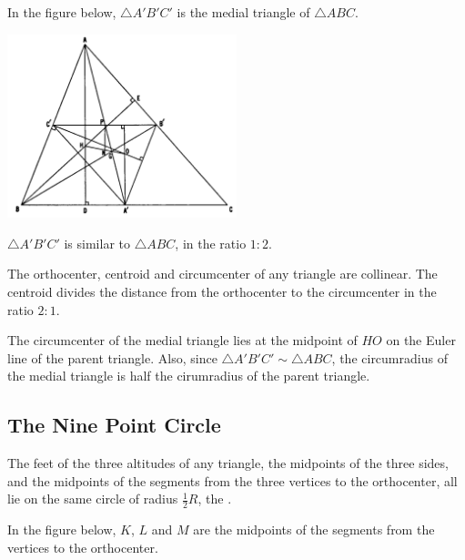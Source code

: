 \documentclass[DIV=12, a4]{scrartcl}
\begin{document}
In the figure below, $\triangle A'B'C'$
 is the medial triangle of $\triangle ABC$.
 
 \begin{center}
		\includegraphics[width=0.5\textwidth]{media/1-7A}
\end{center}

\begin{theorem}
	$\triangle A'B'C'$ is similar to $\triangle ABC$, in the ratio $1:2$.
\end{theorem}

\begin{theorem}
	The orthocenter, centroid and circumcenter of any triangle are collinear. The centroid divides the distance from the orthocenter to the circumcenter in the ratio $2:1$.
\end{theorem}

\begin{theorem}
	The circumcenter of the medial triangle lies at the midpoint of $HO$ on the Euler line of the parent triangle. Also, since $\triangle A'B'C' \sim \triangle ABC$, the circumradius of the medial triangle is half the cirumradius of the parent triangle.
\end{theorem}

\subsection{The Nine Point Circle}

\begin{theorem}
	The feet of the three altitudes of any triangle, the midpoints of the three sides, and the midpoints of the segments from the three vertices to the orthocenter, all lie on the same circle of radius $\frac{1}{2}R$, the .
\end{theorem}

In the figure below, $K$, $L$ and $M$ are the midpoints of the segments from the vertices to the orthocenter.
\end{document}
